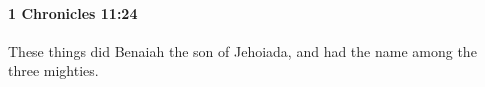 
		\paragraph{1 Chronicles 11:24} %
			\label{1CHRONICLES-11-24}

			These things did Benaiah the son of Jehoiada, and had the name among the three mighties.



